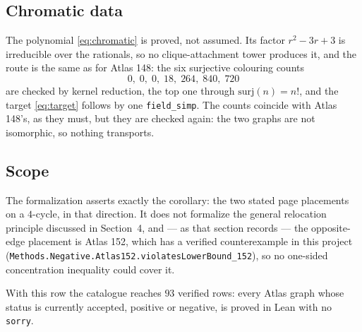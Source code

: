 \documentclass[11pt]{article}
\begin{document}
\subsection{Chromatic data}
\label{sec:app145-chromatic}

The polynomial \eqref{eq:chromatic} is proved, not assumed.  Its factor
$r^2-3r+3$ is irreducible over the rationals, so no clique-attachment tower
produces it, and the route is the same as for Atlas 148: the six surjective
colouring counts
\[
 0,\;0,\;0,\;18,\;264,\;840,\;720
\]
are checked by kernel reduction, the top one through
$\mathrm{surj}(n)=n!$, and the target \eqref{eq:target} follows by one
\texttt{field\_simp}.  The counts coincide with Atlas 148's, as they must,
but they are checked again: the two graphs are not isomorphic, so nothing
transports.

\subsection{Scope}
\label{sec:app145-scope}

The formalization asserts exactly the corollary: the two stated page
placements on a $4$-cycle, in that direction.  It does not formalize the
general relocation principle discussed in Section~4, and --- as that section
records --- the opposite-edge placement is Atlas 152, which has a verified
counterexample in this project
(\texttt{Methods.Negative.Atlas152.violatesLowerBound\_152}), so no
one-sided concentration inequality could cover it.

With this row the catalogue reaches $93$ verified rows: every Atlas graph
whose status is currently accepted, positive or negative, is proved in Lean
with no \texttt{sorry}.
\end{document}
